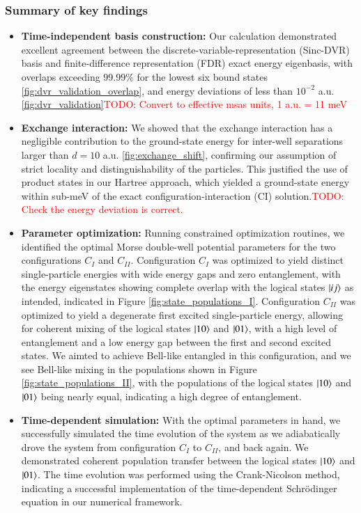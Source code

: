 \documentclass{subfiles}
\begin{document}
\subsubsection*{Summary of key findings}
\begin{itemize}
    \item \textbf{Time-independent basis construction:} Our calculation demonstrated excellent agreement between the discrete-variable-representation (Sinc-DVR) basis and finite-difference representation (FDR) exact energy eigenbasis, with overlaps exceeding $99.99\%$ for the lowest six bound states \ref{fig:dvr_validation_overlap}, and energy deviations of less than $10^{-2}$ a.u. \ref{fig:dvr_validation}\textcolor{red}{TODO: Convert to effective msas units, 1 a.u. = 11 meV}
    \item \textbf{Exchange interaction:} We showed that the exchange interaction has a negligible contribution to the ground-state energy for inter-well separations larger than $d = 10$ a.u. \ref{fig:exchange_shift}, confirming our assumption of strict locality and distinguishability of the particles. This justified the use of product states in our Hartree approach, which yielded a ground-state energy within sub-meV of the exact configuration-interaction (CI) solution.\textcolor{red}{TODO: Check the energy deviation is correct.}
    \item \textbf{Parameter optimization:} Running constrained optimization routines, we identified the optimal Morse double-well potential parameters for the two configurations $C_I$ and $C_{II}$. Configuration $C_I$ was optimized to yield distinct single-particle energies with wide energy gaps and zero entanglement, with the energy eigenstates showing complete overlap with the logical states $\ket{ij}$ as intended, indicated in Figure \ref{fig:state_populations_I}. Configuration $C_{II}$ was optimized to yield a degenerate first excited single-particle energy, allowing for coherent mixing of the logical states $\ket{10}$ and $\ket{01}$, with a high level of entanglement and a low energy gap between the first and second excited states. We aimted to achieve Bell-like entangled in this configuration, and we see Bell-like mixing in the populations shown in Figure \ref{fig:state_populations_II}, with the populations of the logical states $\ket{10}$ and $\ket{01}$ being nearly equal, indicating a high degree of entanglement.
    \item \textbf{Time-dependent simulation:} With the optimal parameters in hand, we successfully simulated the time evolution of the system as we adiabatically drove the system from configuration $C_I$ to $C_{II}$, and back again. We demonstrated coherent population transfer between the logical states $\ket{10}$ and $\ket{01}$. The time evolution was performed using the Crank-Nicolson method, indicating a successful implementation of the time-dependent Schrödinger equation in our numerical framework. 

\end{itemize}
\end{document}
